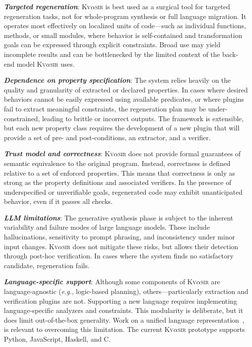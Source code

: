 \documentclass[nonacm,sigplan,review]{acmart}
\def\eg{{\em e.g.}, }
\newcommand{\sys}{{\scshape Kv{$\alpha$}sir}\xspace}
\newcommand{\heading}[1]{\vspace{2pt}\noindent\textbf{\emph{#1}}:\enspace}
\begin{document}
\heading{Targeted regeneration}
\sys is best used as a surgical tool for targeted regeneration tasks, not for whole-program synthesis or full language migration.
It operates most effectively on localized units of code---such as individual functions, methods, or small modules, where behavior is self-contained and transformation goals can be expressed through explicit constraints.
Broad use may yield incomplete results and can be bottlenecked by the limited context of the back-end model \sys uses.

\heading{Dependence on property specification}
The system relies heavily on the quality and granularity of extracted or declared properties.
In cases where desired behaviors cannot be easily expressed using available predicates, or where plugins fail to extract meaningful constraints, the regeneration plan may be under-constrained, leading to brittle or incorrect outputs. The framework is extensible, but each new property class requires the development of a new plugin that will provide a set of pre- and post-conditions, an extractor, and a verifier.

\heading{Trust model and correctness}
\sys
does not provide formal guarantees
of semantic equivalence
to the original program.
Instead,
correctness is defined relative to a set of enforced properties.
This means that correctness is only as strong as the property definitions and associated verifiers.
In the presence of underspecified or unverifiable goals,
regenerated code
may exhibit unanticipated behavior,
even if it passes all checks. 


\heading{LLM limitations}
The generative synthesis phase
is subject to the inherent variability and failure modes
of large language models.
These include hallucinations,
sensitivity to prompt phrasing,
and inconsistency
under minor input changes.
\sys does not mitigate these risks,
but allows their detection
through post-hoc verification.
In cases where the system finds no satisfactory candidate,
regeneration fails.


\heading{Language-specific support}
Although some components of \sys are language-agnostic (\eg logic-based planning),
others---particularly extraction and verification plugins are not.
Supporting a new language
requires implementing language-specific analyzers and constraints.
This modularity is deliberate,
but it does limit out-of-the-box generality.
Work on a unified language representation~\cite{koppel2018onetool,bap2011,dillig2009sail},
is relevant to overcoming this limitation.
The current \sys prototype
supports Python, JavaScript, Haskell, and C. 
\end{document}
